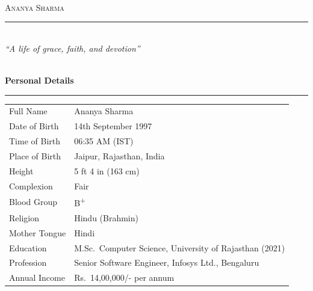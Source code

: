 \documentclass[a4paper,10pt]{article}
\newcommand{\biosection}[1]{%
  \vspace{3pt}%
  \noindent{\color{gold}\rule{\linewidth}{0.55pt}}\\[-2pt]
  {\color{maroon}\small\ding{70}\enspace\textbf{#1}}%
  \\[-3pt]
  {\color{gold}\rule{\linewidth}{0.35pt}}%
  \vspace{1pt}%
}
\begin{document}
\noindent
\begin{minipage}[t]{0.71\linewidth}
  \vspace{0pt}
  \begin{center}
    {\color{maroon}\small{}\enspace{}\enspace{}}\\[2pt]
    {\color{maroon}\large\textsc{Ananya Sharma}}\\[1pt]
    {\color{gold}\rule{0.62\linewidth}{0.45pt}}\\[1pt]
    {\footnotesize\color{maroon!80}\textit{``A life of grace, faith, and devotion''}}
  \end{center}
\end{minipage}%
\hfill
\begin{minipage}[t]{0.26\linewidth}
  \vspace{0pt}
  \begin{center}
  \end{center}
\end{minipage}

\vspace{1pt}

\biosection{Personal Details}

\noindent
\begin{tabularx}{\linewidth}{KV}
  Full Name          & Ananya Sharma \\
  Date of Birth      & 14th September 1997 \\
  Time of Birth      & 06:35 AM (IST) \\
  Place of Birth     & Jaipur, Rajasthan, India \\
  Height             & 5 ft 4 in (163 cm) \\
  Complexion         & Fair \\
  Blood Group        & B\textsuperscript{+} \\
  Religion           & Hindu (Brahmin) \\
  Mother Tongue      & Hindi \\
  Education          & M.Sc.\ Computer Science, University of Rajasthan (2021) \\
  Profession         & Senior Software Engineer, Infosys Ltd., Bengaluru \\
  Annual Income      & Rs.\ 14,00,000/- per annum \\
\end{tabularx}
\end{document}
